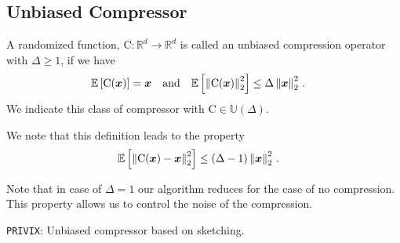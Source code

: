 \documentclass[review,onefignum,onetabnum]{siamart190516}
\begin{document}
\subsection{Unbiased Compressor}
\begin{definition}
A randomized function, $\text{C}:\mathbb{R}^{d}\rightarrow\mathbb{R}^{d}$ is called an unbiased compression operator with $\Delta\geq 1$, if we have 
\begin{align}\notag
\mathbb{E}\left[\text{C}(\boldsymbol{x})\right]&=\boldsymbol{x}\nonumber \quad \textrm{and} \quad    \mathbb{E}\left[\left\|\text{C}(\boldsymbol{x})\right\|^2_2\right] \leq \Delta\left\|\boldsymbol{x}\right\|^2_2\notag \, .
\end{align}
We indicate this class of compressor with $\text{C}\in\mathbb{U}(\Delta)$.
\end{definition}
We note that this definition leads to the property 
\begin{align}\notag
    \mathbb{E}\left[\left\|\text{C}(\boldsymbol{x})-\boldsymbol{x}\right\|^2_2\right]&\leq \left(\Delta-1\right)\left\|\boldsymbol{x}\right\|^2_2\, .
\end{align}
\begin{remark}
Note that in case of $\Delta=1$ our algorithm reduces for the case of no compression. This property allows us to control the noise of the compression.
\end{remark}
\begin{algorithm}[H]
\caption{\texttt{PRIVIX}\cite{li2019privacy}: Unbiased compressor based on sketching. }\label{Alg:privix}
\begin{algorithmic}[1]
\vspace{- 0.1cm}
\end{algorithmic}
\end{algorithm}
\end{document}
